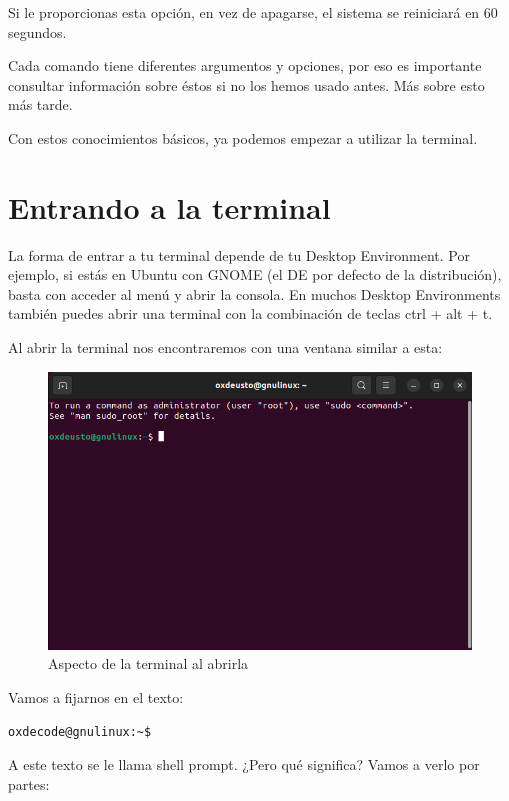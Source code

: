 Si le proporcionas esta opción, en vez de apagarse, el sistema se reiniciará en 60 segundos.

Cada comando tiene diferentes argumentos y opciones, por eso es importante consultar información sobre éstos si no los hemos usado antes. Más sobre esto más tarde.

Con estos conocimientos básicos, ya podemos empezar a utilizar la terminal.

\section{Entrando a la terminal}
La forma de entrar a tu terminal depende de tu Desktop Environment. Por ejemplo, si estás en Ubuntu con GNOME (el DE por defecto de la distribución), basta con acceder al menú y abrir la consola. En muchos Desktop Environments también puedes abrir una terminal con la combinación de teclas ctrl + alt + t.

Al abrir la terminal nos encontraremos con una ventana similar a esta:
\begin{figure}[H]
    \centering
    \includegraphics[width=0.80\linewidth]{resources/images/terminal_abrir.png}
    \caption{Aspecto de la terminal al abrirla}
\end{figure}

Vamos a fijarnos en el texto:

\begin{tcolorbox-code}
\begin{lstlisting}
oxdecode@gnulinux:~$
\end{lstlisting}
\end{tcolorbox-code}

A este texto se le llama shell prompt. ¿Pero qué significa? Vamos a verlo por partes:

